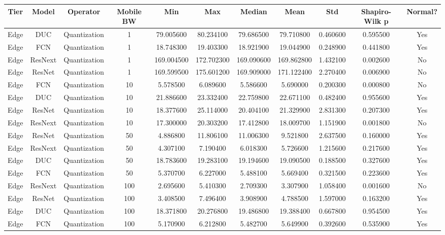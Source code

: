 \begin{tabular}{|c||c||c||c||c||c||c||c||c||c||c|}
\toprule
Tier & Model & Operator & Mobile BW & Min & Max & Median & Mean & Std & Shapiro-Wilk p & Normal? \\
\midrule
Edge & DUC & Quantization & 1 & 79.005600 & 80.234100 & 79.686500 & 79.710800 & 0.460600 & 0.595500 & Yes \\
Edge & FCN & Quantization & 1 & 18.748300 & 19.403300 & 18.921900 & 19.044900 & 0.248900 & 0.441800 & Yes \\
Edge & ResNext & Quantization & 1 & 169.004500 & 172.702300 & 169.090600 & 169.862800 & 1.432100 & 0.002600 & No \\
Edge & ResNet & Quantization & 1 & 169.599500 & 175.601200 & 169.909000 & 171.122400 & 2.270400 & 0.006900 & No \\
Edge & FCN & Quantization & 10 & 5.578500 & 6.089600 & 5.586600 & 5.690000 & 0.200300 & 0.000800 & No \\
Edge & DUC & Quantization & 10 & 21.886600 & 23.332400 & 22.759800 & 22.671100 & 0.482400 & 0.955600 & Yes \\
Edge & ResNet & Quantization & 10 & 18.377600 & 25.114000 & 20.404100 & 21.329900 & 2.831300 & 0.207300 & Yes \\
Edge & ResNext & Quantization & 10 & 17.300000 & 20.303200 & 17.412800 & 18.009700 & 1.151900 & 0.001800 & No \\
Edge & ResNet & Quantization & 50 & 4.886800 & 11.806100 & 11.006300 & 9.521800 & 2.637500 & 0.160000 & Yes \\
Edge & ResNext & Quantization & 50 & 4.307100 & 7.190400 & 6.018300 & 5.726600 & 1.215600 & 0.217600 & Yes \\
Edge & DUC & Quantization & 50 & 18.783600 & 19.283100 & 19.194600 & 19.090500 & 0.188500 & 0.327600 & Yes \\
Edge & FCN & Quantization & 50 & 5.370700 & 6.227000 & 5.488100 & 5.669400 & 0.321500 & 0.223600 & Yes \\
Edge & ResNext & Quantization & 100 & 2.695600 & 5.410300 & 2.709300 & 3.307900 & 1.058400 & 0.001600 & No \\
Edge & ResNet & Quantization & 100 & 3.408500 & 7.496400 & 3.908900 & 4.788500 & 1.597000 & 0.163200 & Yes \\
Edge & DUC & Quantization & 100 & 18.371800 & 20.276800 & 19.486800 & 19.388400 & 0.667800 & 0.954500 & Yes \\
Edge & FCN & Quantization & 100 & 5.170900 & 6.212800 & 5.482700 & 5.649900 & 0.392600 & 0.535900 & Yes \\

\end{tabular}
